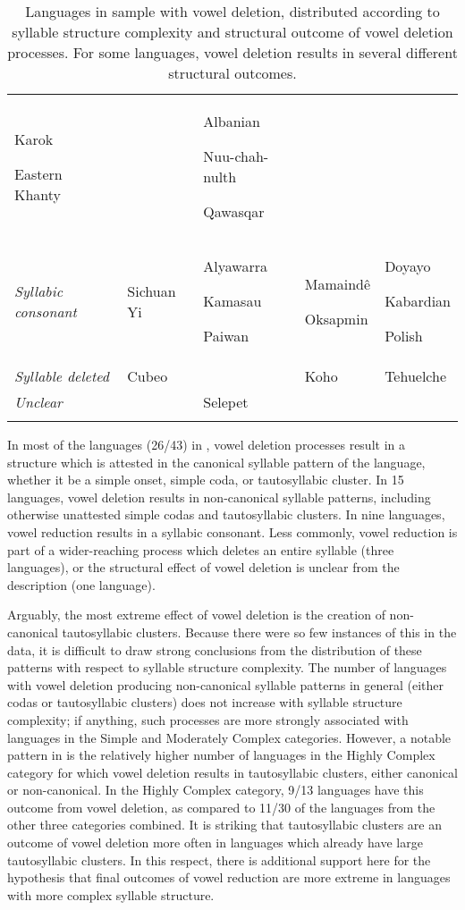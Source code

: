 \begin{table}
\begin{tabularx}{\textwidth}{QQQQQ}
Karok

Eastern Khanty &  & Albanian

Nuu-chah-nulth

Qawasqar\\
\textit{Syllabic consonant} & Sichuan Yi & Alyawarra

Kamasau

Paiwan & Mamaindê

Oksapmin & Doyayo

Kabardian

Polish\\
\textit{Syllable deleted} & Cubeo &  & Koho & Tehuelche\\
\textit{Unclear} &  & Selepet &  & \\
\lspbottomrule
\end{tabularx}
\caption{\label{tab:6.9}Languages in sample with vowel deletion, distributed according to syllable structure complexity and structural outcome of vowel deletion processes. For some languages, vowel deletion results in several different structural outcomes.}
\end{table}

  In most of the languages (26/43) in , vowel deletion processes result in a structure which is attested in the canonical syllable pattern of the language, whether it be a simple onset, simple coda, or tautosyllabic cluster. In 15 languages, vowel deletion results in non-canonical syllable patterns, including otherwise unattested simple codas and tautosyllabic clusters. In nine languages, vowel reduction results in a syllabic consonant. Less commonly, vowel reduction is part of a wider-reaching process which deletes an entire syllable (three languages), or the structural effect of vowel deletion is unclear from the description (one language).

  Arguably, the most extreme effect of vowel deletion is the creation of non-canonical tautosyllabic clusters. Because there were so few instances of this in the data, it is difficult to draw strong conclusions from the distribution of these patterns with respect to syllable structure complexity. The number of languages with vowel deletion producing non-canonical syllable patterns in general (either codas or tautosyllabic clusters) does not increase with syllable structure complexity; if anything, such processes are more strongly associated with languages in the Simple and Moderately Complex categories. However, a notable pattern in  is the relatively higher number of languages in the Highly Complex category for which vowel deletion results in tautosyllabic clusters, either canonical or non-canonical. In the Highly Complex category, 9/13 languages have this outcome from vowel deletion, as compared to 11/30 of the languages from the other three categories combined. It is striking that tautosyllabic clusters are an outcome of vowel deletion more often in languages which already have large tautosyllabic clusters. In this respect, there is additional support here for the hypothesis that final outcomes of vowel reduction are more extreme in languages with more complex syllable structure.   

